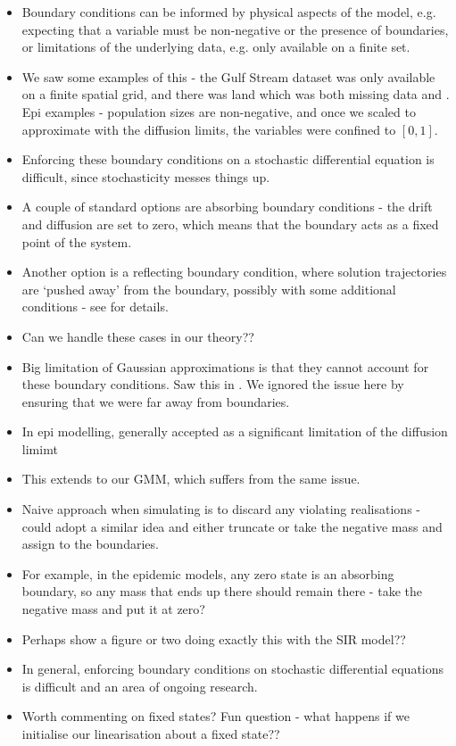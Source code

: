 \begin{itemize}
	\item Boundary conditions can be informed by physical aspects of the model, e.g. expecting that a variable must be non-negative or the presence of boundaries, or limitations of the underlying data, e.g. only available on a finite set.
	\item We saw some examples of this - the Gulf Stream dataset was only available on a finite spatial grid, and there was land which was both missing data and . Epi examples - population sizes are non-negative, and once we scaled to approximate with the diffusion limits, the variables were confined to \([0,1]\).
	\item Enforcing these boundary conditions on a stochastic differential equation is difficult, since stochasticity messes things up.
	\item A couple of standard options are absorbing boundary conditions - the drift and diffusion are set to zero, which means that the boundary acts as a fixed point of the system.
	\item Another option is a reflecting boundary condition, where solution trajectories are `pushed away' from the boundary, possibly with some additional conditions - see \citet{Pilipenko_2014_IntroductionStochasticDifferential} for details.
	\item Can we handle these cases in our theory??
	\item Big limitation of Gaussian approximations is that they cannot account for these boundary conditions. Saw this in . We ignored the issue here by ensuring that we were far away from boundaries.
	\item In epi modelling, generally accepted as a significant limitation of the diffusion limimt
	\item This extends to our GMM, which suffers from the same issue.
	\item Naive approach when simulating is to discard any violating realisations - could adopt a similar idea and either truncate or take the negative mass and assign to the boundaries.
	\item For example, in the epidemic models, any zero state is an absorbing boundary, so any mass that ends up there should remain there - take the negative mass and put it at zero?
	\item Perhaps show a figure or two doing exactly this with the SIR model??
	\item In general, enforcing boundary conditions on stochastic differential equations is difficult and an area of ongoing research.
	\item Worth commenting on fixed states? Fun question - what happens if we initialise our linearisation about a fixed state??
\end{itemize}


